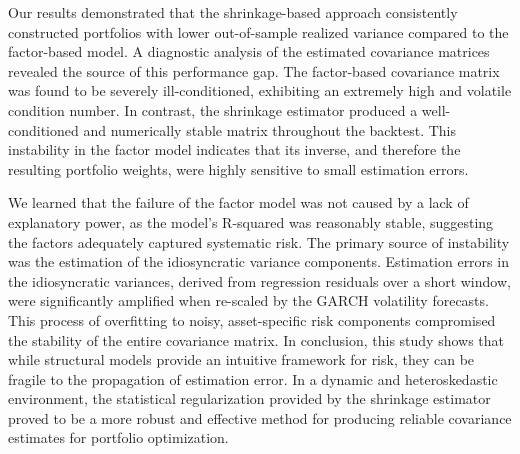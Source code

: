 \documentclass[]{article}
\begin{document}
Our results demonstrated that the shrinkage-based approach consistently constructed portfolios with lower out-of-sample realized variance compared to the factor-based model. A diagnostic analysis of the estimated covariance matrices revealed the source of this performance gap. The factor-based covariance matrix was found to be severely ill-conditioned, exhibiting an extremely high and volatile condition number. In contrast, the shrinkage estimator produced a well-conditioned and numerically stable matrix throughout the backtest. This instability in the factor model indicates that its inverse, and therefore the resulting portfolio weights, were highly sensitive to small estimation errors.

We learned that the failure of the factor model was not caused by a lack of explanatory power, as the model's R-squared was reasonably stable, suggesting the factors adequately captured systematic risk. The primary source of instability was the estimation of the idiosyncratic variance components. Estimation errors in the idiosyncratic variances, derived from regression residuals over a short window, were significantly amplified when re-scaled by the GARCH volatility forecasts. This process of overfitting to noisy, asset-specific risk components compromised the stability of the entire covariance matrix. In conclusion, this study shows that while structural models provide an intuitive framework for risk, they can be fragile to the propagation of estimation error. In a dynamic and heteroskedastic environment, the statistical regularization provided by the shrinkage estimator proved to be a more robust and effective method for producing reliable covariance estimates for portfolio optimization.


{}

\end{document}
